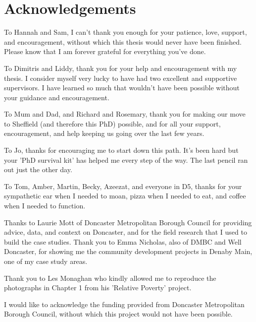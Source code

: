 \chapter*{Acknowledgements}

To Hannah and Sam, I can't thank you enough for your patience, love, support, and encouragement, without which this thesis would never have been finished.
Please know that I am forever grateful for everything you've done.

To Dimitris and Liddy, thank you for your help and encouragement with my thesis.
I consider myself very lucky to have had two excellent and supportive supervisors.
I have learned so much that wouldn't have been possible without your guidance and encouragement.

To Mum and Dad, and Richard and Rosemary, thank you for making our move to Sheffield (and therefore this PhD) possible, and for all your support, encouragement, and help keeping us going over the last few years.

To Jo, thanks for encouraging me to start down this path.
It's been hard but your 'PhD survival kit' has helped me every step of the way.
The last pencil ran out just the other day.

To Tom, Amber, Martin, Becky, Azeezat, and everyone in D5, thanks for your sympathetic ear when I needed to moan, pizza when I needed to eat, and coffee when I needed to function.

Thanks to Laurie Mott of Doncaster Metropolitan Borough Council for providing advice, data, and context on Doncaster, and for the field research that I used to build the case studies.
Thank you to Emma Nicholas, also of DMBC and Well Doncaster, for showing me the community development projects in Denaby Main, one of my case study areas.

Thank you to Les Monaghan who kindly allowed me to reproduce the photographs in Chapter 1 from his 'Relative Poverty' project.

I would like to acknowledge the funding provided from Doncaster Metropolitan Borough Council, without which this project would not have been possible.
